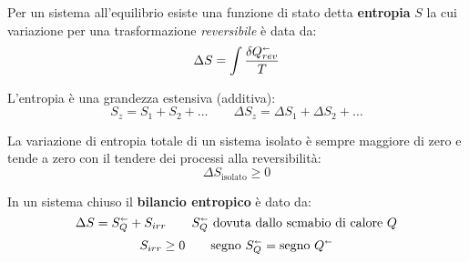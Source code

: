 Per un sistema all'equilibrio esiste una funzione di stato detta \textbf{entropia} $S$ la cui variazione per una trasformazione \emph{reversibile} è data da:
\[\Delta S = \int \frac{\var{Q_{rev}^\shortleftarrow}}{T}\]

L'entropia è una grandezza estensiva (additiva):
\[
    S_z = S_1 + S_2 + \ldots \qquad \Delta S_z = \Delta S_1 + \Delta S_2 + \ldots
\]

La variazione di entropia totale di un sistema isolato è sempre maggiore di zero e tende a zero con il tendere dei processi alla reversibilità:
\[
    \Delta S_{\text{isolato}} \geq 0
\]  

In un sistema chiuso il \textbf{bilancio entropico} è dato da:
\[
    \Delta S = S_Q^\shortleftarrow + S_{irr} \qquad \text{$S_Q^\shortleftarrow$ dovuta dallo scmabio di calore $Q$}
\]
\[
    S_{irr} \ge 0 \qquad \text{segno}~S_Q^\shortleftarrow = \text{segno}~Q^\shortleftarrow
\]